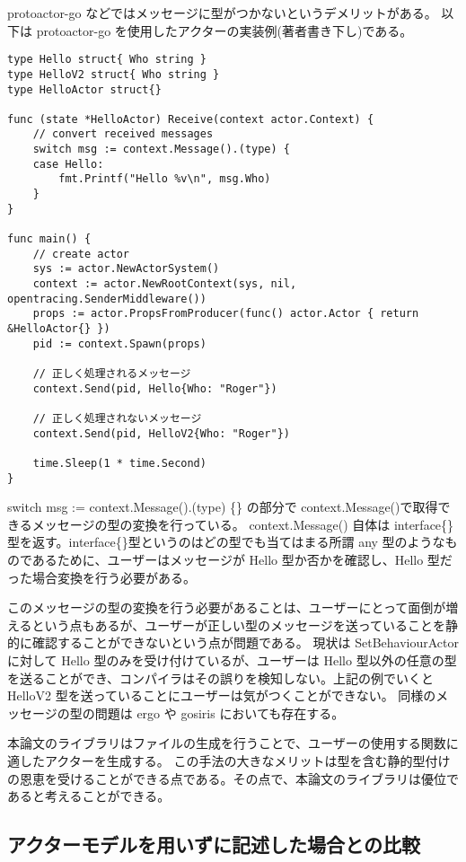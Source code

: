 protoactor-go などではメッセージに型がつかないというデメリットがある。
以下は protoactor-go を使用したアクターの実装例(著者書き下し)である。

\begin{verbatim}
type Hello struct{ Who string }
type HelloV2 struct{ Who string }
type HelloActor struct{}

func (state *HelloActor) Receive(context actor.Context) {
    // convert received messages
    switch msg := context.Message().(type) {
    case Hello:
        fmt.Printf("Hello %v\n", msg.Who)
    }
}

func main() {
    // create actor
    sys := actor.NewActorSystem()
    context := actor.NewRootContext(sys, nil, opentracing.SenderMiddleware())
    props := actor.PropsFromProducer(func() actor.Actor { return &HelloActor{} })
    pid := context.Spawn(props)

    // 正しく処理されるメッセージ
    context.Send(pid, Hello{Who: "Roger"})

    // 正しく処理されないメッセージ
    context.Send(pid, HelloV2{Who: "Roger"})

    time.Sleep(1 * time.Second)
}
\end{verbatim}

switch msg := context.Message().(type) \{\} の部分で
context.Message()で取得できるメッセージの型の変換を行っている。
context.Message() 自体は
interface\{\}型を返す。interface\{\}型というのはどの型でも当てはまる所謂
any 型のようなものであるために、ユーザーはメッセージが Hello
型か否かを確認し、Hello 型だった場合変換を行う必要がある。

このメッセージの型の変換を行う必要があることは、ユーザーにとって面倒が増えるという点もあるが、ユーザーが正しい型のメッセージを送っていることを静的に確認することができないという点が問題である。
現状は SetBehaviourActor に対して Hello
型のみを受け付けているが、ユーザーは Hello
型以外の任意の型を送ることができ、コンパイラはその誤りを検知しない。上記の例でいくと
HelloV2 型を送っていることにユーザーは気がつくことができない。
同様のメッセージの型の問題は ergo や gosiris においても存在する。

本論文のライブラリはファイルの生成を行うことで、ユーザーの使用する関数に適したアクターを生成する。
この手法の大きなメリットは型を含む静的型付けの恩恵を受けることができる点である。その点で、本論文のライブラリは優位であると考えることができる。

\subsection{アクターモデルを用いずに記述した場合との比較}

